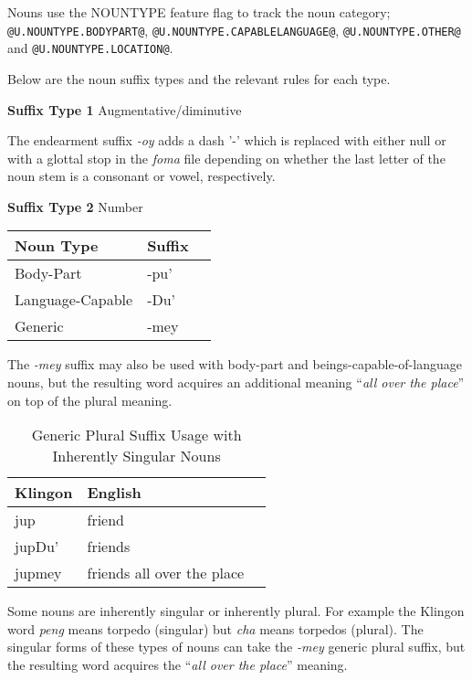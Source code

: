 \documentclass[11pt]{article}
\begin{document}
Nouns use the NOUNTYPE feature flag to track the noun category; \texttt{@U.NOUNTYPE.BODYPART@}, \texttt{@U.NOUNTYPE.CAPABLELANGUAGE@}, \texttt{@U.NOUNTYPE.OTHER@} and \texttt{@U.NOUNTYPE.LOCATION@}.

Below are the noun suffix types and the relevant rules for each type.

\textbf{Suffix Type 1} Augmentative/diminutive

The endearment suffix \textit{-oy} adds a dash '-' which is replaced with either null or with a glottal stop in the \textit{foma} file depending on whether the last letter of the noun stem is a consonant or vowel, respectively.

\textbf{Suffix Type 2} Number

	\begin{center}
	\begin{tabular}{lll}
	\toprule
	\bf{Noun Type} & \bf{Suffix} \\
	\midrule
	Body-Part & -pu' \\
	Language-Capable & -Du' \\
	Generic & -mey \\
	\bottomrule
	\end{tabular}
	\end{center}

The \textit{-mey} suffix may also be used with body-part and beings-capable-of-language nouns, but the resulting word acquires an additional meaning ``\textit{all over the place}'' on top of the plural meaning.
	
	\begin{table}[h]
	\begin{center}
	\begin{tabular}{lll}
	\toprule
	\bf Klingon & \bf English \\
	\midrule
	jup & friend \\
	jupDu' & friends \\
	jupmey & friends all over the place \\
	\bottomrule
	\end{tabular}
	\end{center}
	\caption{Generic Plural Suffix Usage with Inherently Singular Nouns}
	\end{table}

Some nouns are inherently singular or inherently plural. For example the Klingon word \textit{peng} means torpedo (singular) but \textit{cha} means torpedos (plural). The singular forms of these types of nouns can take the \textit{-mey} generic plural suffix, but the resulting word acquires the ``\textit{all over the place}'' meaning.
	
\end{document}
